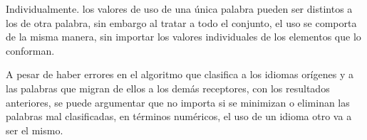 Individualmente. los valores de uso de una única palabra pueden ser distintos a los de otra palabra, sin embargo al tratar a todo el conjunto, el uso se comporta de la misma manera, sin importar los valores individuales de los elementos que lo conforman. 

A pesar de haber errores en el algoritmo que clasifica a los idiomas orígenes y a las palabras que migran de ellos a los demás receptores, con los resultados anteriores, se puede argumentar que no importa si se minimizan o eliminan las palabras mal clasificadas, en términos numéricos, el uso de un idioma otro va a ser el mismo.  

